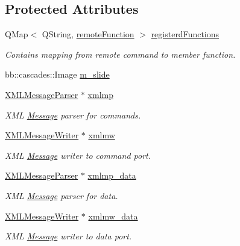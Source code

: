 \subsection*{Protected Attributes}
\begin{DoxyCompactItemize}
\item 
Q\+Map$<$ Q\+String, \hyperlink{_client_8hpp_a6c4537f8fb6619ed97bd1f8e53fb4da0}{remote\+Function} $>$ \hyperlink{class_client_a2e033a4a4015c20b2c0d4c8dccd46e7a}{registerd\+Functions}
\begin{DoxyCompactList}\small\item\em Contains mapping from remote command to member function. \end{DoxyCompactList}\item 
bb\+::cascades\+::\+Image \hyperlink{class_client_a685777e360cd101ddcfeedfe13eac6bf}{m\+\_\+slide}
\item 
\hyperlink{class_x_m_l_message_parser}{X\+M\+L\+Message\+Parser} $\ast$ \hyperlink{class_client_a2ecd2185614d6b5ac3b4409d304fccd6}{xmlmp}
\begin{DoxyCompactList}\small\item\em X\+M\+L \hyperlink{class_message}{Message} parser for commands. \end{DoxyCompactList}\item 
\hyperlink{class_x_m_l_message_writer}{X\+M\+L\+Message\+Writer} $\ast$ \hyperlink{class_client_a4b344048fac2605fed5405cfa3425d4d}{xmlmw}
\begin{DoxyCompactList}\small\item\em X\+M\+L \hyperlink{class_message}{Message} writer to command port. \end{DoxyCompactList}\item 
\hyperlink{class_x_m_l_message_parser}{X\+M\+L\+Message\+Parser} $\ast$ \hyperlink{class_client_a24df7928ad0d6e42ab864b10ecbc20e9}{xmlmp\+\_\+data}
\begin{DoxyCompactList}\small\item\em X\+M\+L \hyperlink{class_message}{Message} parser for data. \end{DoxyCompactList}\item 
\hyperlink{class_x_m_l_message_writer}{X\+M\+L\+Message\+Writer} $\ast$ \hyperlink{class_client_a511d77665d9f4a3094bf6876bc2688b0}{xmlmw\+\_\+data}
\begin{DoxyCompactList}\small\item\em X\+M\+L \hyperlink{class_message}{Message} writer to data port. \end{DoxyCompactList}\item 

\end{DoxyCompactItemize}
